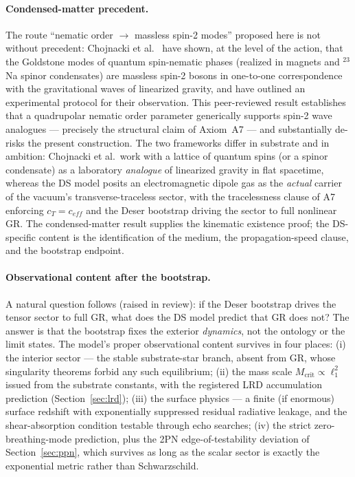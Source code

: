 \documentclass[11pt,a4paper]{article}
\theoremstyle{plain}
\theoremstyle{remark}
\begin{document}
\paragraph{Condensed-matter precedent.} The route ``nematic order $\to$ massless spin-2 modes'' proposed here is not without precedent: Chojnacki et al.\ \cite{chojnacki2024} have shown, at the level of the action, that the Goldstone modes of quantum spin-nematic phases (realized in magnets and $^{23}$Na spinor condensates) are massless spin-2 bosons in one-to-one correspondence with the gravitational waves of linearized gravity, and have outlined an experimental protocol for their observation. This peer-reviewed result establishes that a quadrupolar nematic order parameter generically supports spin-2 wave analogues --- precisely the structural claim of Axiom~A7 --- and substantially de-risks the present construction. The two frameworks differ in substrate and in ambition: Chojnacki et al.\ work with a lattice of quantum spins (or a spinor condensate) as a laboratory \emph{analogue} of linearized gravity in flat spacetime, whereas the DS model posits an electromagnetic dipole gas as the \emph{actual} carrier of the vacuum's transverse-traceless sector, with the tracelessness clause of A7 enforcing $c_T = c_{eff}$ and the Deser bootstrap driving the sector to full nonlinear GR. The condensed-matter result supplies the kinematic existence proof; the DS-specific content is the identification of the medium, the propagation-speed clause, and the bootstrap endpoint.

\paragraph{Observational content after the bootstrap.} A natural question follows (raised in review): if the Deser bootstrap drives the tensor sector to full GR, what does the DS model predict that GR does not? The answer is that the bootstrap fixes the exterior \emph{dynamics}, not the ontology or the limit states. The model's proper observational content survives in four places: (i) the interior sector --- the stable substrate-star branch, absent from GR, whose singularity theorems forbid any such equilibrium; (ii) the mass scale $M_{\text{crit}} \propto \ell_1^2$ issued from the substrate constants, with the registered LRD accumulation prediction (Section~\ref{sec:lrd}); (iii) the surface physics --- a finite (if enormous) surface redshift with exponentially suppressed residual radiative leakage, and the shear-absorption condition testable through echo searches; (iv) the strict zero-breathing-mode prediction, plus the 2PN edge-of-testability deviation of Section~\ref{sec:ppn}, which survives as long as the scalar sector is exactly the exponential metric rather than Schwarzschild.
\end{document}
